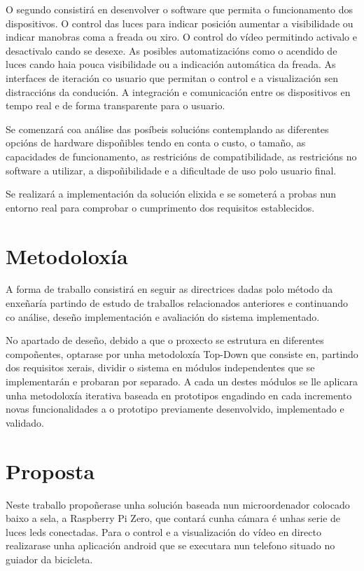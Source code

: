 O segundo consistirá en desenvolver o software que permita o funcionamento dos dispositivos. O control das luces para indicar posición aumentar a visibilidade ou indicar manobras coma a freada ou xiro. O control do vídeo permitindo activalo e desactivalo cando se desexe. As posibles automatizacións como o acendido de luces cando haia pouca visibilidade ou a indicación automática da freada. As interfaces de iteración co usuario que permitan o control e a visualización sen distraccións da condución. A integración e comunicación entre os dispositivos en tempo real e de forma transparente para o usuario.

Se comenzará coa análise das posíbeis solucións contemplando as diferentes opcións de hardware dispoñibles tendo en conta o custo, o tamaño, as capacidades de funcionamento, as restricións de compatibilidade, as restricións no software a utilizar, a dispoñibilidade e a dificultade de uso polo usuario final.

Se realizará a implementación da solución elixida e se someterá a probas nun entorno real para comprobar o cumprimento dos requisitos establecidos.


\section{Metodoloxía}
A forma de traballo consistirá en seguir as directrices dadas polo método da enxeñaría partindo de estudo de traballos relacionados anteriores e continuando co análise, deseño implementación e avaliación do sistema implementado.

No apartado de deseño, debido a que o proxecto se estrutura en diferentes compoñentes, optarase por unha metodoloxía Top-Down que consiste en, partindo dos requisitos xerais, dividir o sistema en módulos independentes que se implementarán e probaran por separado. A cada un destes módulos se lle aplicara unha metodoloxía iterativa baseada en prototipos engadindo en cada incremento novas funcionalidades a o prototipo previamente desenvolvido, implementado e validado.

\section{Proposta}
Neste traballo propoñerase unha solución baseada nun microordenador colocado baixo a sela, a Raspberry Pi Zero, que contará cunha cámara é unhas serie de luces leds conectadas. Para o control e a visualización do vídeo en directo realizarase unha aplicación android que se executara nun telefono situado no guiador da bicicleta.


